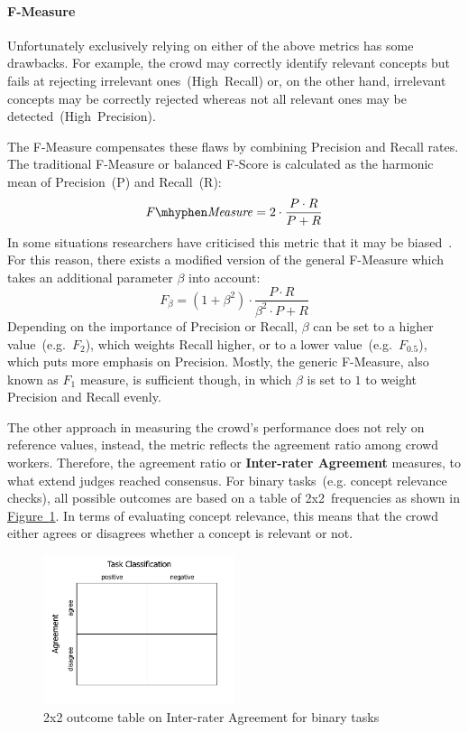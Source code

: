 \documentclass[draft,final]{vutinfth} %
\begin{document}
\paragraph{F-Measure} Unfortunately exclusively relying on either of the above metrics has some drawbacks. For example, the crowd may correctly identify relevant concepts but fails at rejecting irrelevant ones~(High~Recall) or, on the other hand, irrelevant concepts may be correctly rejected whereas not all relevant ones may be detected~(High~Precision). 

The F-Measure compensates these flaws by combining Precision and Recall rates. The traditional F-Measure or balanced F-Score is calculated as the harmonic mean of Precision~(P) and Recall~(R):
\[ \mathit{F \mhyphen Measure} = 2 \cdot \frac{P \cdot R}{P + R} \]
In some situations researchers have criticised this metric that it may be biased~\cite{powers2011}. For this reason, there exists a modified version of the general F-Measure which takes an additional parameter $\beta$ into account:
\[ F_\beta = (1 + \beta^2) \cdot \frac{P \cdot R}{\beta^2 \cdot P + R} \]
Depending on the importance of Precision or Recall, $\beta$ can be set to a higher value~(e.g.~$F_2$), which weights Recall higher, or to a lower value~(e.g.~$F_{0.5}$), which puts more emphasis on Precision. Mostly, the generic F-Measure, also known as $F_1$ measure, is sufficient though, in which $\beta$ is set to $1$ to weight Precision and Recall evenly. 

The other approach in measuring the crowd's performance does not rely on reference values, instead, the metric reflects the agreement ratio among crowd workers. Therefore, the agreement ratio or \textbf{Inter-rater Agreement} measures, to what extend judges reached consensus. For binary tasks~(e.g. concept relevance checks), all possible outcomes are based on a table of 2x2~frequencies as shown in \hyperref[fig:2x2_inter_rater_table]{Figure~\ref*{fig:2x2_inter_rater_table}}. In terms of evaluating concept relevance, this means that the crowd either agrees or disagrees whether a concept is relevant or not. 
\begin{figure}
	 \centering
	 \includegraphics[width=0.5\textwidth]{drawio/Inter_Rater_Outcome_Table}
	 \caption{2x2 outcome table on Inter-rater Agreement for binary tasks}\label{fig:2x2_inter_rater_table}
\end{figure}
\end{document}
